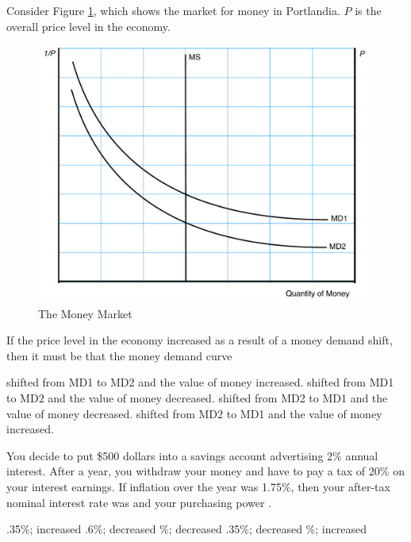 \documentclass[addpoints,11pt]{exam}
\theoremstyle{definition}
\newcommand{\blank}[0]{\underline{\hspace{3cm}}}
\begin{document}
\begin{questions}
\question Consider Figure \ref{MC8}, which shows the market for money in Portlandia. $P$ is the overall price level in the economy.

\begin{figure}[H]
	\centering
	\includegraphics[scale=.40]{Final_MC8.pdf}
	\caption{The Money Market}
	\label{MC8}
\end{figure}

If the price level in the economy increased as a result of a money demand shift, then it must be that the money demand curve

\begin{choices}
	\choice shifted from MD1 to MD2 and the value of money increased.
	\CorrectChoice shifted from MD1 to MD2 and the value of money decreased.
	\choice shifted from MD2 to MD1 and the value of money decreased.
	\choice shifted from MD2 to MD1 and the value of money increased.
\end{choices}


\question You decide to put \$500 dollars into a savings account advertising 2\% annual interest. After a year, you withdraw your money and have to pay a tax of 20\% on your interest earnings. If inflation over the year was 1.75\%, then your after-tax nominal interest rate was \blank and your purchasing power \blank.

\begin{choices}
	\choice .35\%; increased
	\choice .6\%; decreased
	\%; decreased
	\choice .35\%; decreased
	\%; increased
\end{choices}


\end{questions}
\end{document}
